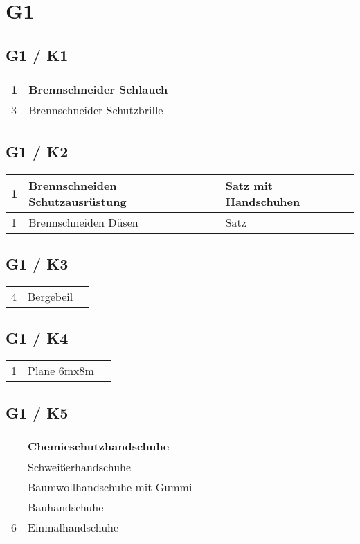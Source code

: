 \section*{G1}

\subsection{G1 / K1}
\begin{tabular}{l|l|l}
	1 & Brennschneider Schlauch & \\
	\hline
	3 & Brennschneider Schutzbrille & \\
\end{tabular}


\subsection{G1 / K2}
\begin{tabular}{l|l|l}
1 & Brennschneiden Schutzausrüstung & Satz mit Handschuhen \\
\hline
1 & Brennschneiden Düsen & Satz \\
\end{tabular}

\subsection{G1 / K3}
\begin{tabular}{l|l|l}
	4 & Bergebeil & \\
\end{tabular}

\subsection{G1 / K4}
\begin{tabular}{l|l|l}
	1 & Plane 6mx8m & \\
\end{tabular}

\subsection{G1 / K5}
\begin{tabular}{l|l|l}
	 & Chemieschutzhandschuhe & \\
	\hline
	 & Schweißerhandschuhe & \\
	\hline
	 & Baumwollhandschuhe mit Gummi & \\
	\hline
	 & Bauhandschuhe & \\
	\hline
	6 & Einmalhandschuhe & \\
\end{tabular}
